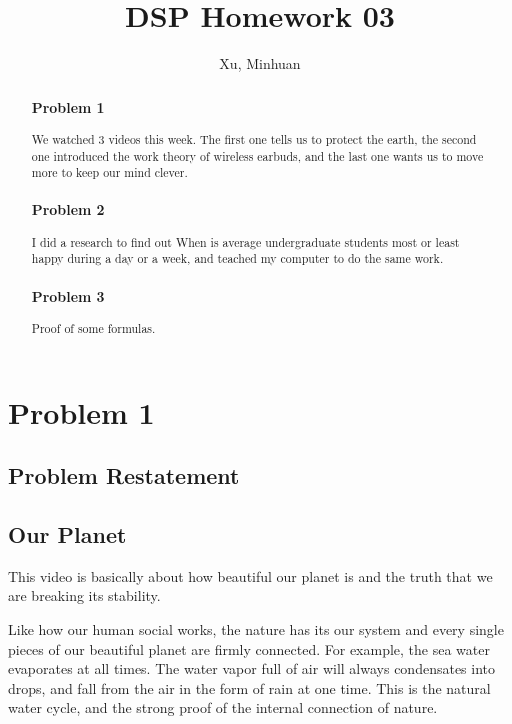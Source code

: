 \documentclass{article}
\begin{document}
\title{DSP Homework 03}
\author{Xu, Minhuan}
\maketitle
\tableofcontents

\begin{abstract}
    \subsubsection*{Problem 1}
        We watched 3 videos this week. The first one tells us to protect the earth, the second one introduced the work theory of wireless earbuds, and the last one wants us to move more to keep our mind clever.
    \subsubsection*{Problem 2}
        I did a research to find out When is average undergraduate students most or least happy during a day or a week, and teached my computer to do the same work.
    \subsubsection*{Problem 3}
        Proof of some formulas.

\end{abstract}

\section{Problem 1}
\subsection*{Problem Restatement}
\subsection{Our Planet}

This video is basically about how beautiful our planet is and the truth that we are breaking its stability.

Like how our human social works, the nature has its our system and every single pieces of our beautiful planet are firmly connected. For example, the sea water evaporates at all times. The water vapor full of air will always condensates into drops, and fall from the air in the form of rain at one time. This is the natural water cycle, and the strong proof of the internal connection of nature.
\end{document}
